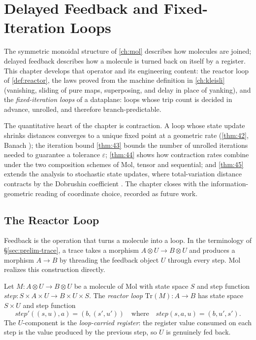 \chapter{Delayed Feedback and Fixed-Iteration Loops}\label{ch:trace}

The symmetric monoidal structure of \autoref{ch:mol} describes how molecules are joined; delayed feedback describes how a molecule is turned back on itself by a register. This chapter develops that operator and its engineering content: the reactor loop of \autoref{def:reactor}, the laws proved from the machine definition in \autoref{ch:kleisli} (vanishing, sliding of pure maps, superposing, and delay in place of yanking), and the \emph{fixed-iteration loops} of a dataplane: loops whose trip count is decided in advance, unrolled, and therefore branch-predictable.

The quantitative heart of the chapter is contraction. A loop whose state update shrinks distances converges to a unique fixed point at a geometric rate (\autoref{thm:42}, Banach \citep{banach}); the iteration bound \autoref{thm:43} bounds the number of unrolled iterations needed to guarantee a tolerance $\varepsilon$; \autoref{thm:44} shows how contraction rates combine under the two composition schemes of Mol, tensor and sequential; and \autoref{thm:45} extends the analysis to stochastic state updates, where total-variation distance contracts by the Dobrushin coefficient \citep{dobroushin}. The chapter closes with the information-geometric reading of coordinate choice, recorded as future work.

\section{The Reactor Loop}\label{sec:trace-reactor}

Feedback is the operation that turns a molecule into a loop. In the terminology of \S\ref{sec:prelim-trace}, a trace takes a morphism $A \otimes U \to B \otimes U$ and produces a morphism $A \to B$ by threading the feedback object $U$ through every step. Mol realizes this construction directly.

\begin{definition}\label{def:reactor}
Let $M \colon A \otimes U \to B \otimes U$ be a molecule of Mol with state space $S$ and step function $\mathit{step} \colon S \times A \times U \to B \times U \times S$. The \emph{reactor loop} $\mathrm{Tr} (M) \colon A \to B$ has state space $S \times U$ and step function
\[ \mathit{step}'((s,u),a) = (b,(s',u')) \quad\text{where}\quad \mathit{step} (s,a,u) = (b,u',s'). \]
The $U$-component is the \emph{loop-carried register}: the register value consumed on each step is the value produced by the previous step, so $U$ is genuinely fed back.
\end{definition}

